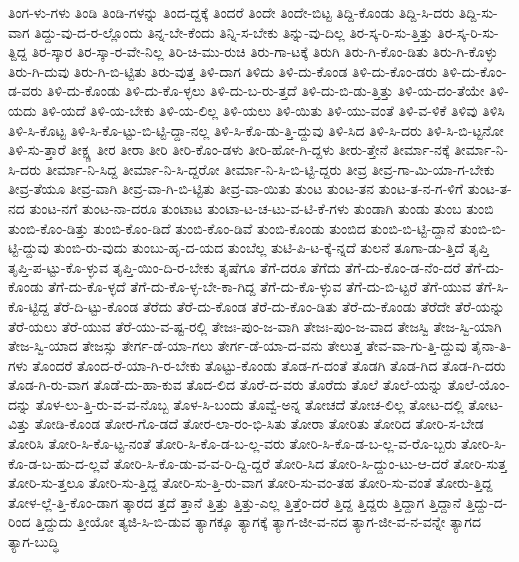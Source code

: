 {ತಿಂಗ-ಳು-ಗಳು
ತಿಂಡಿ
ತಿಂಡಿ-ಗಳನ್ನು
ತಿಂದ-ದ್ದಕ್ಕೆ
ತಿಂದರೆ
ತಿಂದೇ
ತಿಂದೇ-ಬಿಟ್ಟ
ತಿದ್ದಿ-ಕೊಂಡು
ತಿದ್ದಿ-ಸಿ-ದರು
ತಿದ್ದಿ-ಸು-ವಾಗ
ತಿದ್ದು-ವು-ದ-ರ-ಲ್ಲೊಂದು
ತಿನ್ನ-ಬೇ-ಕೆಂದು
ತಿನ್ನಿ-ಸ-ಬೇಕು
ತಿನ್ನು-ವು-ದಿಲ್ಲ
ತಿರ-ಸ್ಕ-ರಿ-ಸು-ತ್ತಿತ್ತು
ತಿರ-ಸ್ಕ-ರಿ-ಸು-ತ್ದಿದ್ದ
ತಿರ-ಸ್ಕಾರ
ತಿರ-ಸ್ಕಾ-ರ-ವೇ-ನಿಲ್ಲ
ತಿರಿ-ಚಿ-ಮು-ರುಚಿ
ತಿರು-ಗಾ-ಟಕ್ಕೆ
ತಿರುಗಿ
ತಿರು-ಗಿ-ಕೊಂ-ಡಿತು
ತಿರು-ಗಿ-ಕೊಳ್ಳು
ತಿರು-ಗಿ-ದುವು
ತಿರು-ಗಿ-ಬಿ-ಟ್ಟಿತು
ತಿರು-ವುತ್ತ
ತಿಳಿ-ದಾಗ
ತಿಳಿದು
ತಿಳಿ-ದು-ಕೊಂಡ
ತಿಳಿ-ದು-ಕೊಂ-ಡರು
ತಿಳಿ-ದು-ಕೊಂ-ಡ-ವರು
ತಿಳಿ-ದು-ಕೊಂಡು
ತಿಳಿ-ದು-ಕೊ-ಳ್ಳಲು
ತಿಳಿ-ದು-ಬ-ರು-ತ್ತದೆ
ತಿಳಿ-ದು-ಬಿ-ಡು-ತ್ತಿತ್ತು
ತಿಳಿ-ಯ-ದಂ-ತೆಯೇ
ತಿಳಿ-ಯದು
ತಿಳಿ-ಯದೆ
ತಿಳಿ-ಯ-ಬೇಕು
ತಿಳಿ-ಯ-ಲಿಲ್ಲ
ತಿಳಿ-ಯಲು
ತಿಳಿ-ಯಿತು
ತಿಳಿ-ಯು-ವಂತೆ
ತಿಳಿ-ವ-ಳಿಕೆ
ತಿಳಿವು
ತಿಳಿಸಿ
ತಿಳಿ-ಸಿ-ಕೊಟ್ಟ
ತಿಳಿ-ಸಿ-ಕೊ-ಟ್ಟು-ಬಿ-ಟ್ಟಿ-ದ್ದಾ-ನಲ್ಲ
ತಿಳಿ-ಸಿ-ಕೊ-ಡು-ತ್ತಿ-ದ್ದುವು
ತಿಳಿ-ಸಿದ
ತಿಳಿ-ಸಿ-ದರು
ತಿಳಿ-ಸಿ-ಬಿ-ಟ್ಟನೋ
ತಿಳಿ-ಸು-ತ್ತಾರೆ
ತೀಕ್ಷ್ಣ
ತೀರ
ತೀರಾ
ತೀರಿ
ತೀರಿ-ಕೊಂ-ಡಳು
ತೀರಿ-ಹೋ-ಗಿ-ದ್ದಳು
ತೀರು-ತ್ತೇನೆ
ತೀರ್ಮಾ-ನಕ್ಕೆ
ತೀರ್ಮಾ-ನಿ-ಸಿ-ದರು
ತೀರ್ಮಾ-ನಿ-ಸಿದ್ದ
ತೀರ್ಮಾ-ನಿ-ಸಿ-ದ್ದರೋ
ತೀರ್ಮಾ-ನಿ-ಸಿ-ಬಿ-ಟ್ಟಿ-ದ್ದರು
ತೀವ್ರ
ತೀವ್ರ-ಗಾ-ಮಿ-ಯಾ-ಗ-ಬೇಕು
ತೀವ್ರ-ತೆಯೂ
ತೀವ್ರ-ವಾಗಿ
ತೀವ್ರ-ವಾ-ಗಿ-ಬಿ-ಟ್ಟಿತು
ತೀವ್ರ-ವಾ-ಯಿತು
ತುಂಟ
ತುಂಟ-ತನ
ತುಂಟ-ತ-ನ-ಗ-ಳಿಗೆ
ತುಂಟ-ತ-ನದ
ತುಂಟ-ನಗೆ
ತುಂಟ-ನಾ-ದರೂ
ತುಂಟಾಟ
ತುಂಟಾ-ಟ-ಚ-ಟು-ವ-ಟಿ-ಕೆ-ಗಳು
ತುಂಡಾಗಿ
ತುಂಡು
ತುಂಬ
ತುಂಬಿ
ತುಂಬಿ-ಕೊಂ-ಡಿತ್ತು
ತುಂಬಿ-ಕೊಂ-ಡಿದೆ
ತುಂಬಿ-ಕೊಂ-ಡಿವೆ
ತುಂಬಿ-ಕೊಂಡು
ತುಂಬಿದ
ತುಂಬಿ-ಬಿ-ಟ್ಟಿ-ದ್ದಾನೆ
ತುಂಬಿ-ಬಿ-ಟ್ಟಿ-ದ್ದುವು
ತುಂಬಿ-ರು-ವುದು
ತುಂಬು-ಹೃ-ದ-ಯದ
ತುಂಬೆಲ್ಲ
ತುಟಿ-ಪಿ-ಟ-ಕ್ಕೆ-ನ್ನದೆ
ತುಲನೆ
ತೂಗಾ-ಡು-ತ್ತಿದೆ
ತೃಪ್ತಿ
ತೃಪ್ತಿ-ಪ-ಟ್ಟು-ಕೊ-ಳ್ಳುವ
ತೃಪ್ತಿ-ಯಿಂ-ದಿ-ರ-ಬೇಕು
ತೃಷೆಗೂ
ತೆಗೆ-ದರೂ
ತೆಗೆದು
ತೆಗೆ-ದು-ಕೊಂ-ಡ-ನೆಂ-ದರೆ
ತೆಗೆ-ದು-ಕೊಂಡು
ತೆಗೆ-ದು-ಕೊ-ಳ್ಳದೆ
ತೆಗೆ-ದು-ಕೊ-ಳ್ಳ-ಬೇ-ಕಾ-ಗಿದ್ದ
ತೆಗೆ-ದು-ಕೊ-ಳ್ಳುವ
ತೆಗೆ-ದು-ಬಿ-ಟ್ಟರೆ
ತೆಗೆ-ಯುವ
ತೆಗೆ-ಸಿ-ಕೊ-ಟ್ಟಿದ್ದ
ತೆರೆ-ದಿ-ಟ್ಟು-ಕೊಂಡ
ತೆರೆದು
ತೆರೆ-ದು-ಕೊಂಡ
ತೆರೆ-ದು-ಕೊಂ-ಡಿತು
ತೆರೆ-ದು-ಕೊಂಡು
ತೆರೆದೇ
ತೆರೆ-ಯನ್ನು
ತೆರೆ-ಯಲು
ತೆರೆ-ಯುವ
ತೆರೆ-ಯು-ವ-ಷ್ಟ-ರಲ್ಲಿ
ತೇಜಃ-ಪುಂ-ಜ-ವಾಗಿ
ತೇಜಃ-ಪುಂ-ಜ-ವಾದ
ತೇಜಸ್ವಿ
ತೇಜ-ಸ್ವಿ-ಯಾಗಿ
ತೇಜ-ಸ್ವಿ-ಯಾದ
ತೇಜಸ್ಸು
ತೇರ್ಗ-ಡೆ-ಯಾ-ಗಲು
ತೇರ್ಗ-ಡೆ-ಯಾ-ದ-ವನು
ತೇಲುತ್ತ
ತೇವ-ವಾ-ಗು-ತ್ತಿ-ದ್ದುವು
ತೈನಾ-ತಿ-ಗಳು
ತೊಂದರೆ
ತೊಂದ-ರೆ-ಯಾ-ಗಿ-ರ-ಬೇಕು
ತೊಟ್ಟು-ಕೊಂಡು
ತೊಡ-ಗ-ದಂತೆ
ತೊಡಗಿ
ತೊಡ-ಗಿದ
ತೊಡ-ಗಿ-ದರು
ತೊಡ-ಗಿ-ರು-ವಾಗ
ತೊಡೆ-ದು-ಹಾ-ಕುವ
ತೊದ-ಲಿದ
ತೊರೆ-ದ-ವರು
ತೊರೆದು
ತೊಲೆ
ತೊಲೆ-ಯನ್ನು
ತೊಲೆ-ಯೊಂ-ದನ್ನು
ತೊಳ-ಲು-ತ್ತಿ-ರು-ವ-ವ-ನೊಬ್ಬ
ತೊಳ-ಸಿ-ಬಂದು
ತೊವ್ವೆ-ಅನ್ನ
ತೋಚದೆ
ತೋಚ-ಲಿಲ್ಲ
ತೋಟ-ದಲ್ಲಿ
ತೋಟ-ವಿತ್ತು
ತೋಡಿ-ಕೊಂಡ
ತೋರ-ಗೊ-ಡದೆ
ತೋರ-ಲಾ-ರಂ-ಭಿ-ಸಿತು
ತೋರಾ
ತೋರಿತು
ತೋರಿದ
ತೋರಿ-ಸ-ಬೇಡ
ತೋರಿಸಿ
ತೋರಿ-ಸಿ-ಕೊ-ಟ್ಟ-ನಂತೆ
ತೋರಿ-ಸಿ-ಕೊ-ಡ-ಬ-ಲ್ಲ-ವರು
ತೋರಿ-ಸಿ-ಕೊ-ಡ-ಬ-ಲ್ಲ-ವ-ರೊ-ಬ್ಬರು
ತೋರಿ-ಸಿ-ಕೊ-ಡ-ಬ-ಹು-ದ-ಲ್ಲವೆ
ತೋರಿ-ಸಿ-ಕೊ-ಡು-ವ-ವ-ರಿ-ದ್ದಿ-ದ್ದರೆ
ತೋರಿ-ಸಿದ
ತೋರಿ-ಸಿ-ದ್ದುಂ-ಟು-ಆ-ದರೆ
ತೋರಿ-ಸುತ್ತ
ತೋರಿ-ಸು-ತ್ತಲೂ
ತೋರಿ-ಸು-ತ್ತಿದ್ದ
ತೋರಿ-ಸು-ತ್ತಿ-ರು-ವಾಗ
ತೋರಿ-ಸು-ವಂ-ತಹ
ತೋರಿ-ಸು-ವಂತೆ
ತೋರು-ತ್ತಿದ್ದ
ತೋಳ-ಲ್ಲೆ-ತ್ತಿ-ಕೊಂ-ಡಾಗ
ತ್ಕಾರದ
ತ್ತದೆ
ತ್ತಾನೆ
ತ್ತಿತ್ತು
ತ್ತಿತ್ತು-ಎಲ್ಲ
ತ್ತಿತ್ತೆಂ-ದರೆ
ತ್ತಿದ್ದ
ತ್ತಿದ್ದರು
ತ್ತಿದ್ದಾಗ
ತ್ತಿದ್ದಾನೆ
ತ್ತಿದ್ದು-ದ-ರಿಂದ
ತ್ತಿದ್ದುದು
ತ್ತೀಯೋ
ತ್ಯಜಿ-ಸಿ-ಬಿ-ಡುವ
ತ್ಯಾಗಕ್ಕೂ
ತ್ಯಾಗಕ್ಕೆ
ತ್ಯಾಗ-ಜೀ-ವ-ನದ
ತ್ಯಾಗ-ಜೀ-ವ-ನ-ವನ್ನೇ
ತ್ಯಾಗದ
ತ್ಯಾಗ-ಬುದ್ಧಿ
}
